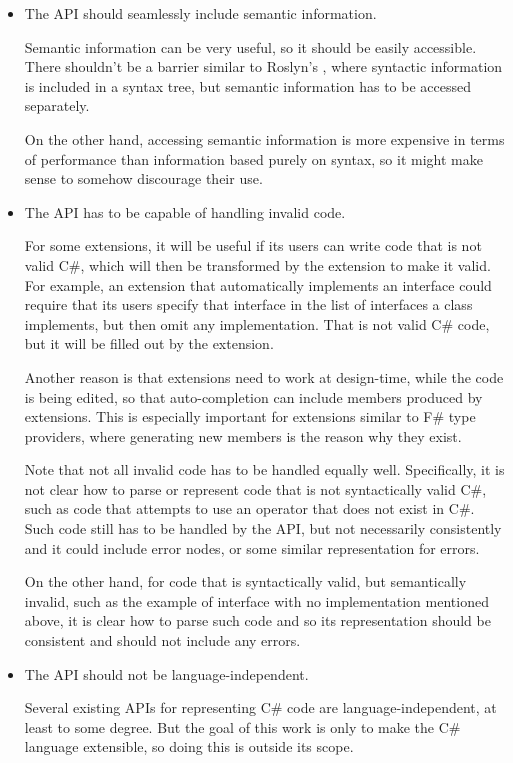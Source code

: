 \begin{itemize}
\item The \ac{API} should seamlessly include semantic information.

Semantic information can be very useful, so it should be easily accessible. There shouldn't be a barrier similar to Roslyn's , where syntactic information is included in a syntax tree, but semantic information has to be accessed separately.

On the other hand, accessing semantic information is more expensive in terms of performance than information based purely on syntax, so it might make sense to somehow discourage their use.

\item The \ac{API} has to be capable of handling invalid code.

For some extensions, it will be useful if its users can write code that is not valid C\#, which will then be transformed by the extension to make it valid. For example, an extension that automatically implements an interface could require that its users specify that interface in the list of interfaces a class implements, but then omit any implementation. That is not valid C\# code, but it will be filled out by the extension.

Another reason is that extensions need to work at design-time, while the code is being edited, so that auto-completion can include members produced by extensions. This is especially important for extensions similar to F\# type providers, where generating new members is the reason why they exist.

Note that not all invalid code has to be handled equally well. Specifically, it is not clear how to parse or represent  code that is not syntactically valid C\#, such as code that attempts to use an operator that does not exist in C\#. Such code still has to be handled by the \ac{API}, but not necessarily consistently and it could include error nodes, or some similar representation for errors.

On the other hand, for code that is syntactically valid, but semantically invalid, such as the example of interface with no implementation mentioned above, it is clear how to parse such code and so its representation should be consistent and should not include any errors.

\item The \ac{API} should not be language-independent.

\nopagebreak

Several existing \acp{API} for representing C\# code are language-independent, at least to some degree. But the goal of this work is only to make the C\# language extensible, so doing this is outside its scope.

\end{itemize}

